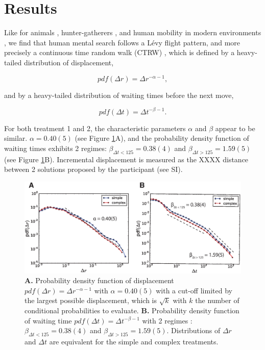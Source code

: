 \section{Results}

Like for animals \cite{}, hunter-gatherers \cite{}, and human mobility in modern environments \cite{}, we find that human mental search follows a L\'evy flight pattern, and more precisely a continuous time random walk (CTRW) \cite{montroll_random_1965}, which is defined by a heavy-tailed distribution of displacement, 

\begin{equation}
\label{displacements}
pdf(\Delta r) = \Delta r^{-\alpha -1},
\end{equation}

and by a heavy-tailed distribution of waiting times before the next move, 

\begin{equation}
\label{wtimes}
pdf(\Delta t) = \Delta t^{-\beta -1}.
\end{equation}

For both treatment 1 and 2, the characteristic parameters $\alpha$ and $\beta$ appear to be similar. $\alpha = 0.40(5)$ (see Figure \ref{fig:CTRW}A), and the probability density function of waiting times exhibits 2 regimes:  $\beta_{\Delta t < 125} = 0.38(4)$ and $\beta_{\Delta t > 125} = 1.59(5)$ (see Figure \ref{fig:CTRW}B). Incremental displacement is measured as the XXXX distance between 2 solutions proposed by the participant (see SI).

\begin{figure}[h!]
\begin{center}
\includegraphics[width=17cm]{figures/CTRW.eps}
\caption{\footnotesize{{\bf A.} Probability density function of displacement $pdf(\Delta r) = \Delta r^{-\alpha -1}$ with $\alpha = 0.40(5)$ with a cut-off limited by the largest possible displacement, which is $\sqrt{k}$ with $k$ the number of conditional probabilities to evaluate. {\bf B.}  Probability density function of waiting time $pdf(\Delta t) = \Delta t^{-\beta -1}$ with 2 regimes : $\beta_{\Delta t < 125} = 0.38(4)$ and $\beta_{\Delta t > 125} = 1.59(5)$. Distributions of $\Delta r$ and $\Delta t$ are equivalent for the simple and complex treatments.}}
\label{fig:CTRW}
\end{center}
\end{figure}

